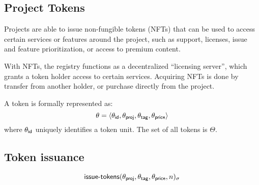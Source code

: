 
\subsection{Project Tokens}
Projects are able to issue non-fungible tokens (NFTs) that can be used to
access certain services or features around the project, such as support,
licenses, issue and feature prioritization, or access to premium content.

With NFTs, the registry functions as a decentralized ``licensing server'',
which grants a token holder access to certain services. Acquiring NFTs
is done by transfer from another holder, or purchase directly from the
project.

A token is formally represented as:
\[
    \theta = \langle\theta_{\mathsf{id}}, \theta_{\mathsf{proj}}, \theta_{\mathsf{tag}},
                    \theta_{\mathsf{price}}\rangle
\]
where $\theta_{\mathsf{id}}$ uniquely identifies a token unit. The set of
all tokens is $\Theta$.

\subsection{Token issuance}
\[
    \operatorname{\mathsf{issue-tokens}}\lparen\theta_{\mathsf{proj}}, \theta_{\mathsf{tag}}, \theta_{\mathsf{price}}, n\rparen_\sigma
\]

